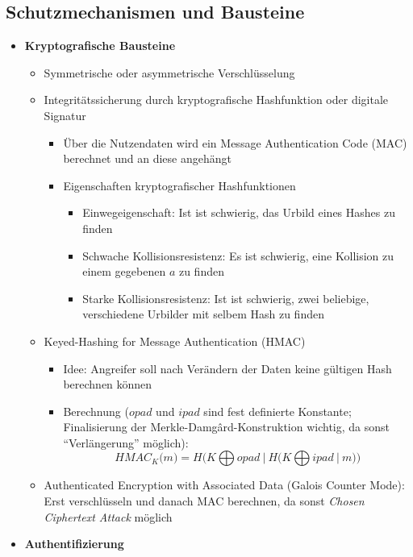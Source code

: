 \subsection{Schutzmechanismen und Bausteine}
\begin{itemize}
	\item \textbf{Kryptografische Bausteine}
	\begin{itemize}
		\item Symmetrische oder asymmetrische Verschlüsselung
		\item Integritätssicherung durch kryptografische Hashfunktion oder digitale Signatur
		\begin{itemize}
			\item Über die Nutzendaten wird ein Message Authentication Code (MAC) berechnet und an diese angehängt
			\item Eigenschaften kryptografischer Hashfunktionen
			\begin{itemize}
				\item Einwegeigenschaft: Ist ist schwierig, das Urbild eines Hashes zu finden
				\item Schwache Kollisionsresistenz: Es ist schwierig, eine Kollision zu einem gegebenen \(a\) zu finden
				\item Starke Kollisionsresistenz: Ist ist schwierig, zwei beliebige, verschiedene Urbilder mit selbem Hash zu finden
			\end{itemize}
		\end{itemize}
		\item Keyed-Hashing for Message Authentication (HMAC)
		\begin{itemize}
			\item Idee: Angreifer soll nach Verändern der Daten keine gültigen Hash berechnen können
			\item Berechnung (\(opad\) und \(ipad\) sind fest definierte Konstante; Finalisierung der Merkle-Damgârd-Konstruktion wichtig, da sonst "`Verlängerung"' möglich):
			\begin{equation}
				HMAC_K\big(m\big) = H \Big( K \bigoplus opad~\big|~H \big( K \bigoplus ipad~|~m \big) \Big)
			\end{equation}
		\end{itemize}
		\item Authenticated Encryption with Associated Data (Galois Counter Mode): Erst verschlüsseln und danach MAC berechnen, da sonst \textit{Chosen Ciphertext Attack} möglich
	\end{itemize}
	\item \textbf{Authentifizierung}

\end{itemize}

